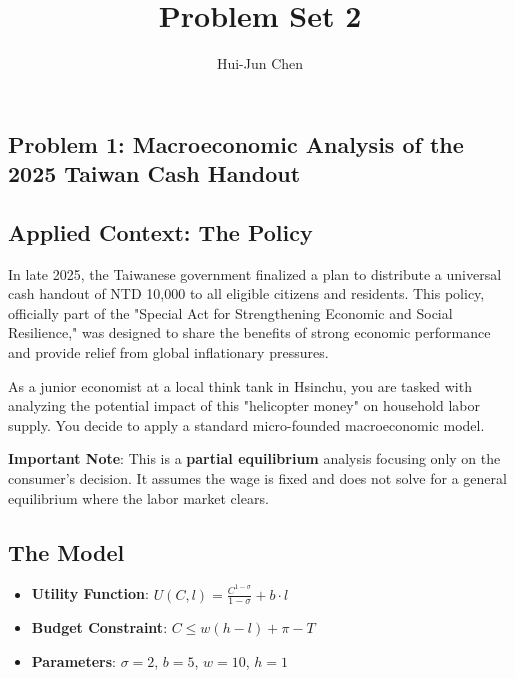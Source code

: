\documentclass[14pt]{extarticle}
\title{Problem Set 2}
\author{Hui-Jun Chen}
\newcommand{\red}[1]{\textcolor{red}{#1}}
\newcommand{\showAns}{\setboolean{showAns}{true}}
\begin{document}
\maketitle





\begin{Exercise}

\section*{Problem 1: Macroeconomic Analysis of the 2025 Taiwan Cash Handout}

\subsection*{Applied Context: The Policy}
In late 2025, the Taiwanese government finalized a plan to distribute a universal cash handout of NTD 10,000 to all eligible citizens and residents. This policy, officially part of the "Special Act for Strengthening Economic and Social Resilience," was designed to share the benefits of strong economic performance and provide relief from global inflationary pressures.

As a junior economist at a local think tank in Hsinchu, you are tasked with analyzing the potential impact of this "helicopter money" on household labor supply. You decide to apply a standard micro-founded macroeconomic model.

\textbf{Important Note}: This is a \textbf{partial equilibrium} analysis focusing only on the consumer's decision. It assumes the wage is fixed and does not solve for a general equilibrium where the labor market clears.

\subsection*{The Model}
\begin{itemize}
    \item \textbf{Utility Function}: $U(C, l) = \frac{C^{1-\sigma}}{1-\sigma} + b \cdot l$
    \item \textbf{Budget Constraint}: $C \le w(h - l) + \pi - T$
    \item \textbf{Parameters}: $\sigma = 2$, $b = 5$, $w = 10$, $h = 1$
\end{itemize}


\end{Exercise}
\end{document}
